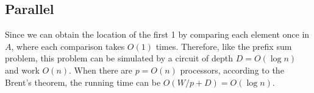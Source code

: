 \documentclass[12pt,onecolumn,a4paper]{article}
\begin{document}
\subsection*{Parallel}
Since we can obtain the location of the first 1 by comparing each element once in $A$, where each comparison takes $O(1)$ times. Therefore, like the prefix sum problem, this problem can be simulated by a circuit of depth $D=O(\log n)$ and work $O(n)$. When there are $p=O(n)$ processors, according to the Brent's theorem, the running time can be $O(W/p+D)=O(\log n)$.
\end{document}
